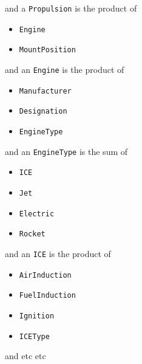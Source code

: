 \begin{frame}
\begin{center}
and a \lstinline{Propulsion} is the product of
\end{center}
\begin{itemize}
\item \lstinline{Engine}
\item \lstinline{MountPosition}
\end{itemize}
\end{frame}

\begin{frame}
\begin{center}
and an \lstinline{Engine} is the product of
\end{center}
\begin{itemize}
\item \lstinline{Manufacturer}
\item \lstinline{Designation}
\item \lstinline{EngineType}
\end{itemize}
\end{frame}

\begin{frame}
\begin{center}
and an \lstinline{EngineType} is the sum of
\end{center}
\begin{itemize}
\item \lstinline{ICE}
\item \lstinline{Jet}
\item \lstinline{Electric}
\item \lstinline{Rocket}
\end{itemize}
\end{frame}

\begin{frame}
\begin{center}
and an \lstinline{ICE} is the product of
\end{center}
\begin{itemize}
\item \lstinline{AirInduction}
\item \lstinline{FuelInduction}
\item \lstinline{Ignition}
\item \lstinline{ICEType}
\end{itemize}
\end{frame}

\begin{frame}
\begin{center}
and etc etc
\end{center}
\end{frame}

